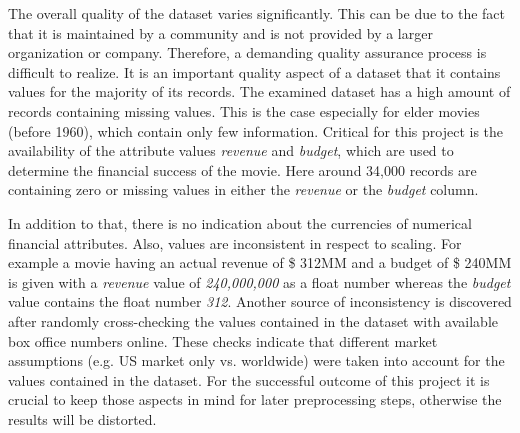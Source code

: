 The overall quality of the dataset varies significantly. This can be due to the fact that it is maintained by a community and is not provided by a larger organization or company. Therefore, a demanding quality assurance process is difficult to realize. It is an important quality aspect of a dataset that it contains values for the majority of its records. The examined dataset has a high amount of records containing missing values. This is the case especially for elder movies (before 1960), which contain only few information. Critical for this project is the availability of the attribute values \textit{revenue} and \textit{budget}, which are used to determine the financial success of the movie. Here around 34,000 records are containing zero or missing values in either the \textit{revenue} or the \textit{budget} column.

In addition to that, there is no indication about the currencies of numerical financial attributes. Also, values are inconsistent in respect to scaling. For example a movie having an actual revenue of \$ 312MM and a budget of \$ 240MM is given with a \textit{revenue} value of \textit{240,000,000} as a float number whereas the \textit{budget} value contains the float number \textit{312}. Another source of inconsistency is discovered after randomly cross-checking the values contained in the dataset with available box office numbers online. These checks indicate that different market assumptions (e.g. US market only vs. worldwide) were taken into account for the values contained in the dataset. For the successful outcome of this project it is crucial to keep those aspects in mind for later preprocessing steps, otherwise the results will be distorted.

